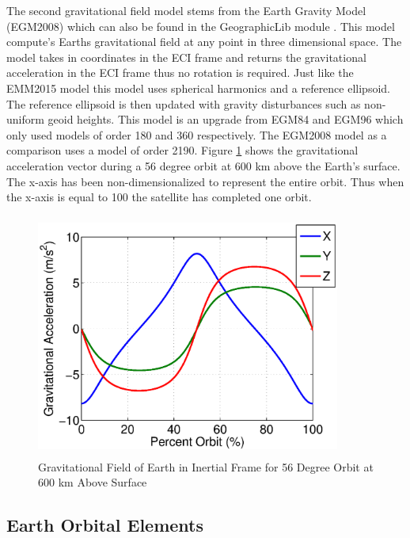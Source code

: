 \documentclass{article}
\begin{document}
The second gravitational field model stems from the
Earth Gravity Model (EGM2008) \cite{EGM2008} which can also be found
in the GeographicLib module \cite{GeographicLib}. This model compute's
Earths gravitational field at any point in three dimensional
space. The model takes in coordinates in the ECI frame and returns the
gravitational acceleration in the ECI frame thus no rotation is
required. Just like the EMM2015 model this model uses spherical
harmonics and a reference ellipsoid. The reference ellipsoid is then
updated with gravity disturbances such as non-uniform geoid
heights. This model is an upgrade from EGM84 and EGM96 which only
used models of order 180 and 360 respectively. The EGM2008 model as a
comparison uses a model of order 2190. Figure \ref{f:grav_orbit} shows
the gravitational acceleration vector during a 56 degree orbit at 600 km above the
Earth's surface. The x-axis has been non-dimensionalized to 
represent the entire orbit. Thus when the x-axis is equal to 100 the
satellite has completed one orbit.
\begin{figure}[H]
  \begin{center}
  \includegraphics[height=80mm, width=100mm]{Figures/Gravity_Field_Orbit}
  \end{center}
  \caption{Gravitational Field of Earth in Inertial Frame for 56 Degree
    Orbit at 600 km Above Surface}\label{f:grav_orbit}
\end{figure}

\subsection{Earth Orbital Elements}\label{s:ephemeris}
\end{document}
